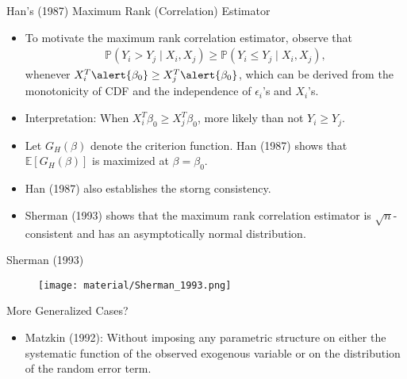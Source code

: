 \documentclass[xcolor=svgnames,dvipdfmx,cjk]{beamer}
\theoremstyle{example}
\def\E{\mathbb{E}}
\def\P{\mathbb{P}}
\begin{document}
\begin{frame}{Han's (1987) Maximum Rank (Correlation) Estimator}
\begin{itemize}
    \item To motivate the maximum rank correlation estimator, observe that
          \begin{align*}
            \P(Y_i > Y_j \mid X_i, X_j) \geq \P(Y_i \leq Y_j \mid X_i, X_j),
          \end{align*}
          whenever $X_i^T\alert{\beta_0} \geq X_j^T\alert{\beta_0}$,
          which can be derived from the monotonicity of CDF 
          and the independence of $\epsilon_i$'s and $X_i$'s.
    \item \alert{Interpretation}: 
          When $X_i^T\beta_0 \geq X_j^T\beta_0$, more likely than not $Y_i \geq Y_j$.
    \item Let $G_H(\beta)$ denote the criterion function. 
          Han (1987) shows that $\E[G_H(\beta)]$ is maximized at $\beta = \beta_0$.
    \item Han (1987) also establishes the storng consistency.
    \item Sherman (1993) shows that 
          the maximum rank correlation estimator is $\sqrt{n}$-consistent
          and has an asymptotically normal distribution.
\end{itemize}
\end{frame}  

\begin{frame}{Sherman (1993)}
  \begin{figure}
    \begin{center}
      \texttt{[image: material/Sherman\_1993.png]}
    \end{center}
  \end{figure}
\end{frame}

\begin{frame}{More Generalized Cases?}
\begin{itemize}
  \item Matzkin (1992): 
        Without imposing any parametric structure on 
        either the systematic function of the observed exogenous variable
        or on the distribution of the random error term.
\end{itemize}
\end{frame}

  
\end{document}
